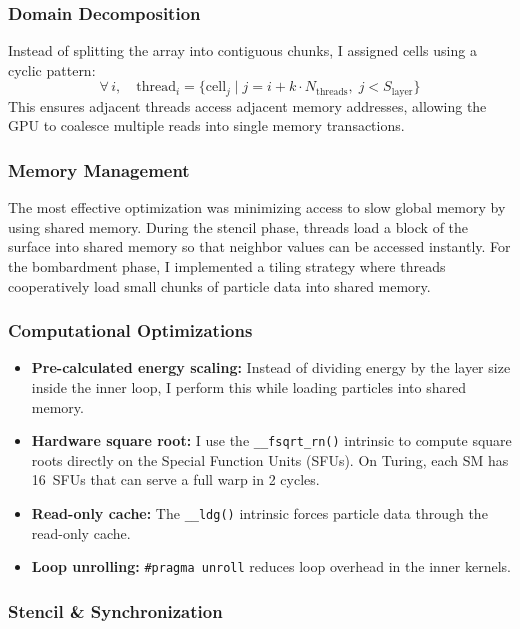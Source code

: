 \documentclass[10pt,dvipsnames,table,twocolumn]{article}
\let\oldtexttt\texttt
\renewcommand{\texttt}[1]{%
  {\small\colorbox{Mist}{\oldtexttt{\textcolor{DarkInk}{#1}}}}%
}
\begin{document}
\subsubsection{Domain Decomposition}

Instead of splitting the array into contiguous chunks, I assigned cells using a cyclic pattern:
\begin{equation}
\forall\, i,\quad \text{thread}_i = \{ \text{cell}_j \;|\; j = i + k \cdot N_{\text{threads}},\; j < S_{\text{layer}} \}
\end{equation}
This ensures adjacent threads access adjacent memory addresses, allowing the GPU to coalesce multiple reads into single memory transactions.

\subsubsection{Memory Management}

The most effective optimization was minimizing access to slow global memory by using shared memory. During the stencil phase, threads load a block of the surface into shared memory so that neighbor values can be accessed instantly. For the bombardment phase, I implemented a tiling strategy where threads cooperatively load small chunks of particle data into shared memory.

\subsubsection{Computational Optimizations}

\begin{itemize}
  \item \textbf{Pre-calculated energy scaling:} Instead of dividing energy by the layer size inside the inner loop, I perform this while loading particles into shared memory.
  \item \textbf{Hardware square root:} I use the \texttt{\_\_fsqrt\_rn()} intrinsic to compute square roots directly on the Special Function Units (SFUs). On Turing, each SM has 16~SFUs that can serve a full warp in 2 cycles.
  \item \textbf{Read-only cache:} The \texttt{\_\_ldg()} intrinsic forces particle data through the read-only cache.
  \item \textbf{Loop unrolling:} \texttt{\#pragma~unroll} reduces loop overhead in the inner kernels.
\end{itemize}

\subsubsection{Stencil \& Synchronization}
\end{document}
